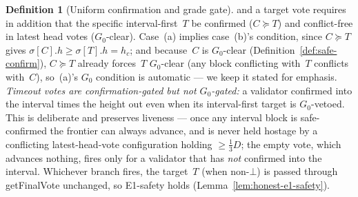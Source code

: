 \ifx\litemode\undefined\documentclass{article}\fi
\newcommand{\getFinalVote}{\textsf{getFinalVote}\xspace}
\newcommand{\Dvote}{\ensuremath{D}}         %
\newcommand{\Gzero}{\ensuremath{G_{0}}}
\theoremstyle{plain}
\theoremstyle{definition}
\newtheorem{definition}{Definition}
\theoremstyle{remark}
\begin{document}
\begin{definition}[Uniform confirmation and grade gate]
and a target vote requires in addition that the specific interval-first~$T$ be
confirmed ($C \succeq T$) and conflict-free in latest head votes ($\Gzero$-clear).
Case~(a) implies case~(b)'s condition, since $C \succeq T$ gives
$\sigma[C].h \geq \sigma[T].h = h_c$; and because~$C$ is $\Gzero$-clear
(Definition~\ref{def:safe-confirm}), $C \succeq T$ already forces~$T$
$\Gzero$-clear (any block conflicting with~$T$ conflicts with~$C$), so~(a)'s
$\Gzero$ condition is automatic --- we keep it stated for emphasis.
\emph{Timeout votes are confirmation-gated but not $\Gzero$-gated:} a validator
confirmed into the interval times the height out even when its interval-first
target is $\Gzero$-vetoed.  This is deliberate and preserves liveness --- once
any interval block is safe-confirmed the frontier can always advance, and is
never held hostage by a conflicting latest-head-vote configuration holding
$\geq \tfrac13\Dvote$; the empty vote, which advances nothing, fires only for a
validator that has \emph{not} confirmed into the interval.  Whichever branch
fires, the target~$T$ (when non-$\bot$) is passed through \getFinalVote{}
unchanged, so E1-safety holds (Lemma~\ref{lem:honest-e1-safety}).
\end{definition}
\end{document}
